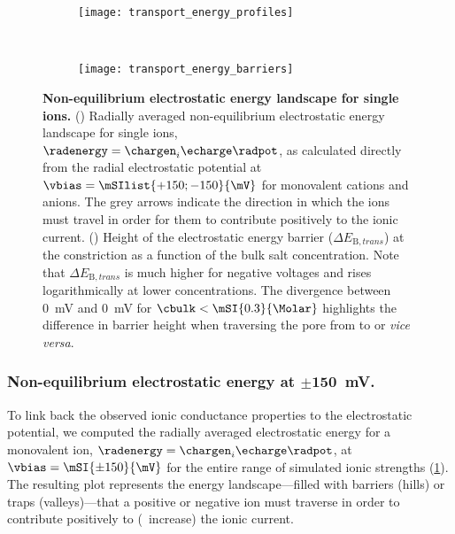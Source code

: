 %
\begin{figure}[p]
  \centering
  
  \begin{subfigure}[t]{11cm}
    \centering
    \caption{}\vspace{-5mm}\label{fig:transport_energy_profiles}
    \texttt{[image: transport\_energy\_profiles]}
  \end{subfigure}
  \\
  \begin{subfigure}[t]{9cm}
    \centering
    \caption{}\vspace{-3mm}\label{fig:transport_energy_barriers}
    \texttt{[image: transport\_energy\_barriers]}
  \end{subfigure}

  \caption[Non-equilibrium electrostatic energy landscape for single ions.]%
  {%
    \textbf{Non-equilibrium electrostatic energy landscape for single ions.}
    ()
    Radially averaged non-equilibrium electrostatic energy landscape for single ions, $\radenergy =
    \chargen_{i} \echarge \radpot$, as calculated directly from the radial electrostatic potential at $\vbias
    = \mSIlist{+150;-150}{\mV}$ for monovalent cations and anions. The grey arrows indicate the direction in
    which the ions must travel in order for them to contribute positively to the ionic current.
    ()
    Height of the electrostatic energy barrier ($\Delta E_{\text{B},\mathit{trans}}$) at the \transi{}
    constriction as a function of the bulk salt concentration. Note that $\Delta E_{\text{B},\mathit{trans}}$
    is much higher for negative voltages and rises logarithmically at lower concentrations. The divergence
    between \SI[explicit-sign=+]{0}{\mV} and \SI[explicit-sign=-]{0}{\mV} for $\cbulk < \mSI{0.3}{\Molar}$
    highlights the difference in barrier height when traversing the pore from \cisi{} to \transi{} or
    \textit{vice versa}.
  }\label{fig:transport_energy}
\end{figure}
%

\subsubsection{Non-equilibrium electrostatic energy at $\mathbf{\pm150}$~mV.}
%

To link back the observed ionic conductance properties to the electrostatic potential, we computed the
radially averaged electrostatic energy for a monovalent ion, $\radenergy = \chargen_{i} \echarge \radpot$, at
$\vbias = \mSI{\pm150}{\mV}$ for the entire range of simulated ionic strengths
(\cref{fig:transport_energy_profiles}). The resulting plot represents the energy landscape---filled with
barriers (hills) or traps (valleys)---that a positive or negative ion must traverse in order to contribute
positively to (\ie~increase) the ionic current.


